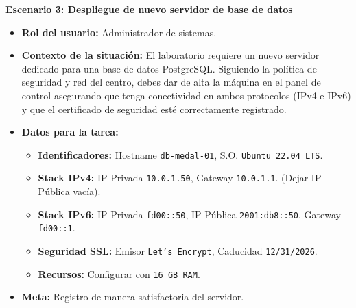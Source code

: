 \noindent\textbf{Escenario 3: Despliegue de nuevo servidor de base de datos}
\begin{itemize}
    \item \textbf{Rol del usuario:} Administrador de sistemas.
    \item \textbf{Contexto de la situación:} 
    El laboratorio requiere un nuevo servidor dedicado para una base de datos PostgreSQL. Siguiendo la política de seguridad y red del centro, debes dar de alta la máquina en el panel de control asegurando que tenga conectividad en ambos protocolos (IPv4 e IPv6) y que el certificado de seguridad esté correctamente registrado.
    
    \item \textbf{Datos para la tarea:}
        \begin{itemize}
            \item \textbf{Identificadores:} Hostname \texttt{db-medal-01}, S.O. \texttt{Ubuntu 22.04 LTS}.
            \item \textbf{Stack IPv4:} IP Privada \texttt{10.0.1.50}, Gateway \texttt{10.0.1.1}. (Dejar IP Pública vacía).
            \item \textbf{Stack IPv6:} IP Privada \texttt{fd00::50}, IP Pública \texttt{2001:db8::50}, Gateway \texttt{fd00::1}.
            \item \textbf{Seguridad SSL:} Emisor \texttt{Let's Encrypt}, Caducidad \texttt{12/31/2026}.
            \item \textbf{Recursos:} Configurar con \texttt{16 GB RAM}.
        \end{itemize}
    \item \textbf{Meta:} Registro de manera satisfactoria del servidor. 
\end{itemize}



